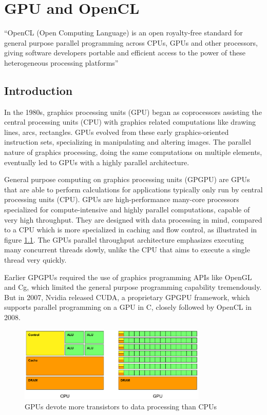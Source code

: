 \chapter{GPU and OpenCL}
\label{chap:arch}
``OpenCL (Open Computing Language) is an open royalty-free standard
for general purpose parallel programming across CPUs, GPUs and other
processors, giving software developers portable and efficient access
to the power of these heterogeneous processing platforms''
\cite{cl-spec}

\section{Introduction}

In the 1980s, graphics processing units (GPU) began as coprocessors
assisting the central processing units (CPU) with graphics related
computations like drawing lines, arcs, rectangles. GPUs evolved from
these early graphics-oriented instruction sets, specializing in
manipulating and altering images. The parallel nature of graphics
processing, doing the same computations on multiple elements,
eventually led to GPUs with a highly parallel architecture.

General purpose computing on graphics processing units (GPGPU) are
GPUs that are able to perform calculations for applications typically
only run by central processing units (CPU). GPUs are high-performance
many-core processors specialized for compute-intensive and highly
parallel computations, capable of very high throughput. They are
designed with data processing in mind, compared to a CPU which is more
specialized in caching and flow control, as illustrated in figure
\ref{fig:cpu-vs-gpu}. The GPUs parallel throughput architecture
emphasizes executing many concurrent threads slowly, unlike the CPU
that aims to execute a single thread very quickly.

Earlier GPGPUs required the use of graphics programming APIs like
OpenGL and Cg, which limited the general purpose programming
capability tremendously. But in 2007, Nvidia released CUDA, a
proprietary GPGPU framework, which supports parallel programming on a
GPU in C, closely followed by OpenCL in 2008.

\begin{figure}
  \includegraphics[width=0.8\textwidth]{images/cpu-vs-gpu.pdf}
  \caption{GPUs devote more transistors to data processing than CPUs}
  \label{fig:cpu-vs-gpu}
\end{figure}


